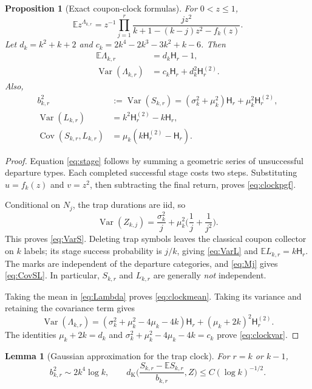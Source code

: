 \documentclass[11pt]{amsart}
\newtheorem{lemma}[theorem]{Lemma}
\newtheorem{proposition}[theorem]{Proposition}
\theoremstyle{remark}
\numberwithin{equation}{section}
\DeclareMathOperator{\Var}{Var}
\DeclareMathOperator{\Cov}{Cov}
\newcommand{\E}{\mathbb{E}}
\newcommand{\dK}{d_{\mathrm{K}}}
\newcommand{\Harm}{\mathsf{H}}
\begin{document}
\begin{proposition}[Exact coupon-clock formulas]\label{prop:clock}
For $0<z\le 1$,
\begin{equation}\label{eq:clockpgf}
\E z^{\Lambda_{k,r}}=z^{-1}\prod_{j=1}^r\frac{jz^2}{k+1-(k-j)z^2-f_k(z)}.
\end{equation}
Let $d_k=k^2+k+2$ and $c_k=2k^4-2k^3-3k^2+k-6$. Then
\begin{align}
\E\Lambda_{k,r}&=d_k\Harm_r-1,\label{eq:clockmean}\\
\Var(\Lambda_{k,r})&=c_k\Harm_r+d_k^2\Harm^{(2)}_r.\label{eq:clockvar}
\end{align}
Also,
\begin{align}
b_{k,r}^2&:=\Var(S_{k,r})=(\sigma_k^2+\mu_k^2)\Harm_r+\mu_k^2\Harm^{(2)}_r,\label{eq:VarS}\\
\Var(L_{k,r})&=k^2\Harm^{(2)}_r-k\Harm_r,\label{eq:VarL}\\
\Cov(S_{k,r},L_{k,r})&=\mu_k(k\Harm^{(2)}_r-\Harm_r).\label{eq:CovSL}
\end{align}
\end{proposition}

\begin{proof}
Equation \eqref{eq:stage} follows by summing a geometric series of unsuccessful departure types. Each completed successful stage costs two steps. Substituting $u=f_k(z)$ and $v=z^2$, then subtracting the final return, proves \eqref{eq:clockpgf}.

Conditional on $N_j$, the trap durations are iid, so
\[
\Var(Z_{k,j})=\frac{\sigma_k^2}{j}+\mu_k^2\Big(\frac1j+\frac1{j^2}\Big).
\]
This proves \eqref{eq:VarS}. Deleting trap symbols leaves the classical coupon collector on $k$ labels; its stage success probability is $j/k$, giving \eqref{eq:VarL} and $\E L_{k,r}=k\Harm_r$. The marks are independent of the departure categories, and \eqref{eq:Mj} gives \eqref{eq:CovSL}. In particular, $S_{k,r}$ and $L_{k,r}$ are generally \emph{not} independent.

Taking the mean in \eqref{eq:Lambda} proves \eqref{eq:clockmean}. Taking its variance and retaining the covariance term gives
\[
\Var(\Lambda_{k,r})=(\sigma_k^2+\mu_k^2-4\mu_k-4k)\Harm_r+(\mu_k+2k)^2\Harm^{(2)}_r.
\]
The identities $\mu_k+2k=d_k$ and $\sigma_k^2+\mu_k^2-4\mu_k-4k=c_k$ prove \eqref{eq:clockvar}.
\end{proof}

\begin{lemma}[Gaussian approximation for the trap clock]\label{lem:trapclt}
For $r=k$ or $k-1$,
\[
b_{k,r}^2\sim 2k^4\log k,\qquad \dK\Big(\frac{S_{k,r}-\E S_{k,r}}{b_{k,r}},Z\Big)\le C(\log k)^{-1/2}.
\]
\end{lemma}
\end{document}
